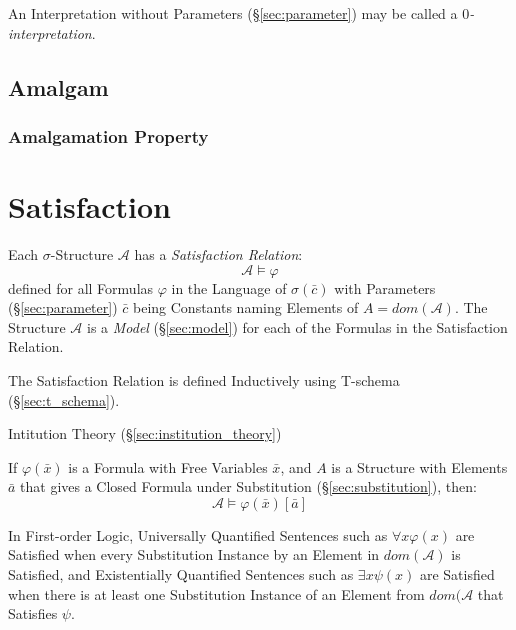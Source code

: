 An Interpretation without Parameters (\S\ref{sec:parameter}) may be
called a \emph{$0$-interpretation}.



\subsection{Amalgam}\label{sec:amalgam}

\subsubsection{Amalgamation Property}\label{sec:amalgamation_property}



\section{Satisfaction}\label{sec:satisfaction}

Each $\sigma$-Structure $\mathcal{A}$ has a \emph{Satisfaction
  Relation}:
\[
  \mathcal{A} \models \varphi
\]
defined for all Formulas $\varphi$ in the Language of
$\sigma(\bar{c})$ with Parameters (\S\ref{sec:parameter}) $\bar{c}$
being Constants naming Elements of $A = dom(\mathcal{A})$. The
Structure $\mathcal{A}$ is a \emph{Model} (\S\ref{sec:model}) for each
of the Formulas in the Satisfaction Relation.

The Satisfaction Relation is defined Inductively using T-schema
(\S\ref{sec:t_schema}).

Intitution Theory (\S\ref{sec:institution_theory})

If $\varphi(\bar{x})$ is a Formula with Free Variables $\bar{x}$, and
$A$ is a Structure with Elements $\bar{a}$ that gives a Closed Formula
under Substitution (\S\ref{sec:substitution}), then:
\[
  \mathcal{A} \models \varphi(\bar{x})[\bar{a}]
\]

In First-order Logic, Universally Quantified Sentences such as
$\forall x \varphi (x)$ are Satisfied when every Substitution Instance
by an Element in $dom(\mathcal{A})$ is Satisfied, and Existentially
Quantified Sentences such as $\exists x \psi (x)$ are Satisfied when
there is at least one Substitution Instance of an Element from
$dom(\mathcal{A}$ that Satisfies $\psi$.



